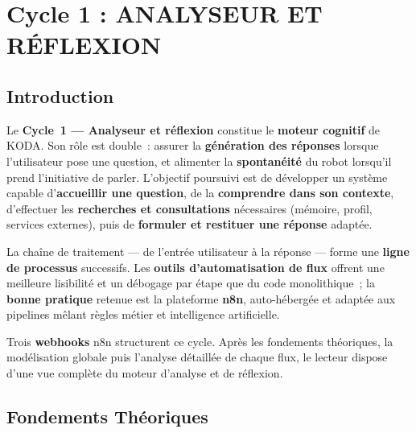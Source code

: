 \documentclass[a4paper,12pt]{report}
\begin{document}
	\chapter{Cycle 1 : ANALYSEUR ET RÉFLEXION}
	
	
	\section{Introduction}
	
	Le \textbf{Cycle~1 --- Analyseur et réflexion} constitue le \textbf{moteur cognitif} de KODA.
	Son rôle est double~: assurer la \textbf{génération des réponses} lorsque l'utilisateur
	pose une question, et alimenter la \textbf{spontanéité} du robot lorsqu'il prend
	l'initiative de parler. L'objectif poursuivi est de développer un système capable
	d'\textbf{accueillir une question}, de la \textbf{comprendre dans son contexte},
	d'effectuer les \textbf{recherches et consultations} nécessaires (mémoire, profil,
	services externes), puis de \textbf{formuler et restituer une réponse} adaptée.
	
	La chaîne de traitement --- de l'entrée utilisateur à la réponse --- forme une
	\textbf{ligne de processus} successifs. Les \textbf{outils d'automatisation de flux}
	offrent une meilleure lisibilité et un débogage par étape que du code monolithique~;
	la \textbf{bonne pratique} retenue est la plateforme \textbf{n8n}, auto-hébergée et
	adaptée aux pipelines mêlant règles métier et intelligence artificielle.
	
	Trois \textbf{webhooks} n8n structurent ce cycle. Après les fondements théoriques, la
	modélisation globale puis l'analyse détaillée de chaque flux, le lecteur dispose d'une
	vue complète du moteur d'analyse et de réflexion.
	
	\section{Fondements Théoriques}
	
\end{document}
